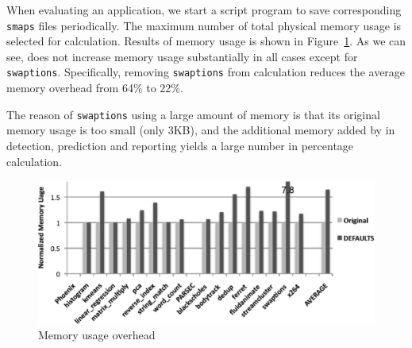 When evaluating an application, we start a script program to save 
corresponding \texttt{smaps} files periodically. 
The maximum number of total physical memory usage is selected for calculation.
Results of memory usage is shown in Figure~\ref{fig:memusage}. As we can see,
\Predator{} does not increase memory usage substantially in all cases except for \texttt{swaptions}. 
Specifically, removing \texttt{swaptions} from calculation reduces 
the average memory overhead from 64\% to 22\%. 

The reason of \texttt{swaptions} using a large amount of memory is that 
its original memory usage is too small (only 3KB), and 
the additional memory added by \Predator{} in detection, prediction and
reporting yields a large number in percentage calculation. 

\begin{figure}
\begin{center} 
\includegraphics[width=6.5in]{fig/memusage}
\end{center}
\caption{Memory usage overhead}
\label{fig:memusage}
\end{figure}


